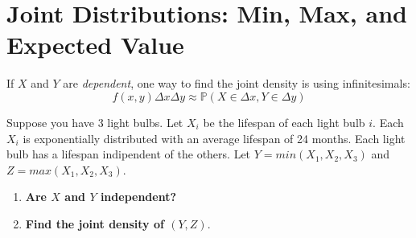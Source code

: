 \documentclass[titlepage, 12pt, leqno]{article}
\begin{document}
\section{Joint Distributions: Min, Max, and Expected Value}
If $X$ and $Y$ are \textit{dependent}, one way to find the joint density is using
infinitesimals:
\[
f(x,y)\Delta x \Delta y \approx \mathbb{P}(X \in \Delta x, Y \in \Delta y)
\]
\begin{ex}
    Suppose you have 3 light bulbs. Let $X_i$ be the lifespan of each light bulb
    $i$. Each $X_i$ is exponentially distributed with an average lifespan of 24
    months. Each light bulb has a lifespan indipendent of the others. Let $Y = 
    min(X_1,X_2,X_3)$ and $Z = max(X_1, X_2, X_3)$.
    \begin{enumerate}
        \item \textbf{Are $X$ and $Y$ independent?}

        \item \textbf{Find the joint density of $(Y,Z)$}.
            \vspace{10px}
            

\end{enumerate}
\end{ex}
\end{document}
